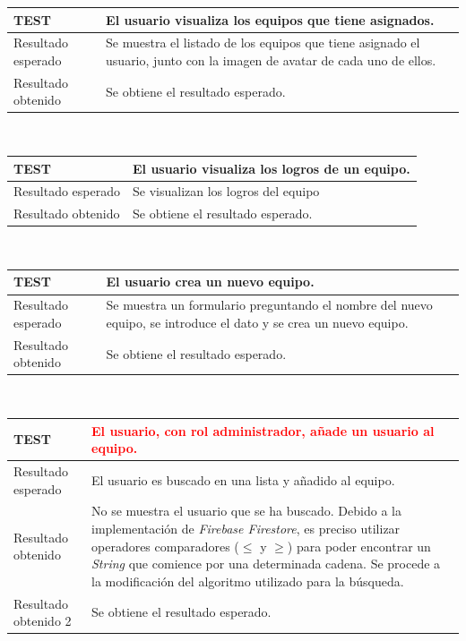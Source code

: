 \documentclass[twoside]{report}
\newcommand\addrow[2]{#1 &#2\\ }
\newcommand\addheading[2]{#1 &#2\\ \hline}
\newcommand\tabularhead{\begin{tabular}{lp{0.7\textwidth}}
\hline
}
\newenvironment{test}{\tabularhead}
{\hline\end{tabular}}
\begin{document}
\vspace{0.5cm}

\begin{test}
  \addheading{\textbf{TEST\arabic{test}}}{El usuario visualiza los equipos que tiene asignados.} 
  \addrow{Resultado esperado}{Se muestra el listado de los equipos que tiene asignado el usuario, junto con la imagen de avatar de cada uno de ellos.}
  \addrow{Resultado obtenido}{Se obtiene el resultado esperado.}
\end{test}\\

\vspace{0.5cm}

\begin{test}
  \addheading{\textbf{TEST\arabic{test}}}{El usuario visualiza los logros de un equipo.} 
  \addrow{Resultado esperado}{Se visualizan los logros del equipo}
  \addrow{Resultado obtenido}{Se obtiene el resultado esperado.}
\end{test}\\

\vspace{0.5cm}

\begin{test}
  \addheading{\textbf{TEST\arabic{test}}}{El usuario crea un nuevo equipo.} 
  \addrow{Resultado esperado}{Se muestra un formulario preguntando el nombre del nuevo equipo, se introduce el dato y se crea un nuevo equipo.}
  \addrow{Resultado obtenido}{Se obtiene el resultado esperado.}
\end{test}\\

\vspace{0.5cm}

\begin{test}
 \addheading{\textbf{TEST\arabic{test}}}{\textcolor{red}{El usuario, con rol administrador, añade un usuario al equipo.}}
 \addrow{Resultado esperado}{El usuario es buscado en una lista y añadido al equipo.}
 \addrow{Resultado obtenido}{No se muestra el usuario que se ha buscado. Debido a la implementación de \textit{Firebase Firestore}, es preciso utilizar operadores comparadores ($\leqslant$ y $\geqslant$) para poder encontrar un \textit{String} que comience por una determinada cadena. Se procede a la modificación del algoritmo utilizado para la búsqueda. }
  \addrow{Resultado obtenido 2}{Se obtiene el resultado esperado.}
\end{test}\\
\end{document}
